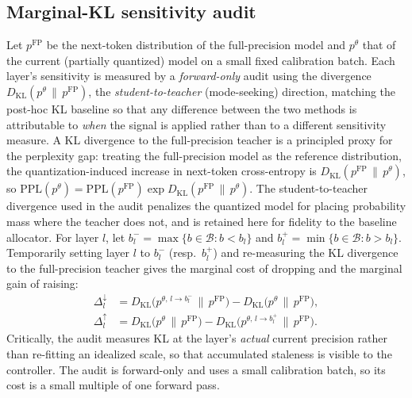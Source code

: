 \documentclass[conference]{IEEEtran}
\begin{document}
\subsection{Marginal-KL sensitivity audit}
Let \(p^{\text{FP}}\) be the next-token distribution of the full-precision model
and \(p^{\theta}\) that of the current (partially quantized) model on a small
fixed calibration batch. Each layer's sensitivity is measured by a
\emph{forward-only} audit using the divergence \(D_{\mathrm{KL}}(p^{\theta}\,\|\,
p^{\text{FP}})\), the \emph{student-to-teacher} (mode-seeking) direction, matching
the post-hoc KL baseline \cite{kllens} so that any difference between the two
methods is attributable to \emph{when} the signal is applied rather than to a
different sensitivity measure. A KL divergence to the full-precision teacher is a
principled proxy for the perplexity gap: treating the full-precision model as the
reference distribution, the quantization-induced increase in next-token
cross-entropy is \(D_{\mathrm{KL}}(p^{\text{FP}}\,\|\,p^{\theta})\), so
\(\mathrm{PPL}(p^{\theta}) = \mathrm{PPL}(p^{\text{FP}})\exp
D_{\mathrm{KL}}(p^{\text{FP}}\,\|\,p^{\theta})\). The student-to-teacher divergence
used in the audit penalizes the quantized model for placing probability mass where
the teacher does not, and is retained here for fidelity to the baseline allocator. For layer \(l\), let \(b_l^- =
\max\{b\in\mathcal{B}: b<b_l\}\) and \(b_l^+ = \min\{b\in\mathcal{B}: b>b_l\}\).
Temporarily setting layer \(l\) to \(b_l^-\) (resp.\ \(b_l^+\)) and re-measuring
the KL divergence to the full-precision teacher gives the marginal cost of
dropping and the marginal gain of raising:
\begin{align}
\Delta^{\downarrow}_l &= D_{\mathrm{KL}}\!\big(p^{\theta,\,l\to b_l^-} \,\|\, p^{\text{FP}}\big) - D_{\mathrm{KL}}\!\big(p^{\theta} \,\|\, p^{\text{FP}}\big), \label{eq:down}\\
\Delta^{\uparrow}_l   &= D_{\mathrm{KL}}\!\big(p^{\theta} \,\|\, p^{\text{FP}}\big) - D_{\mathrm{KL}}\!\big(p^{\theta,\,l\to b_l^+} \,\|\, p^{\text{FP}}\big). \label{eq:up}
\end{align}
Critically, the audit measures KL at the layer's \emph{actual} current precision
rather than re-fitting an idealized scale, so that accumulated staleness is
visible to the controller. The audit is forward-only and uses a small
calibration batch, so its cost is a small multiple of one forward pass.
\end{document}
